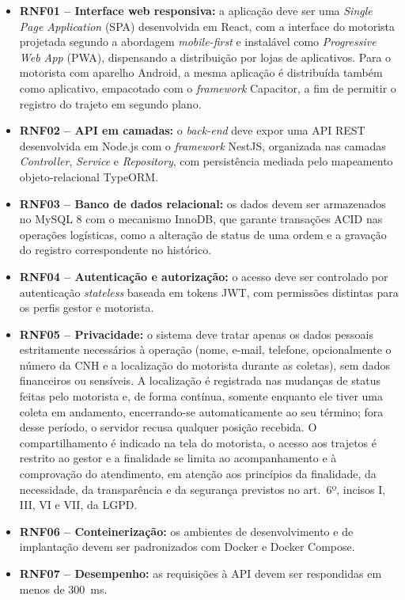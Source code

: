 \begin{itemize}
  \item \textbf{RNF01 -- Interface web responsiva:} a aplicação deve ser uma \textit{Single Page Application} (SPA) desenvolvida em React, com a interface do motorista projetada segundo a abordagem \textit{mobile-first} e instalável como \textit{Progressive Web App} (PWA), dispensando a distribuição por lojas de aplicativos. Para o motorista com aparelho Android, a mesma aplicação é distribuída também como aplicativo, empacotado com o \textit{framework} Capacitor, a fim de permitir o registro do trajeto em segundo plano.
  \item \textbf{RNF02 -- API em camadas:} o \textit{back-end} deve expor uma API REST desenvolvida em Node.js com o \textit{framework} NestJS, organizada nas camadas \textit{Controller}, \textit{Service} e \textit{Repository}, com persistência mediada pelo mapeamento objeto-relacional TypeORM.
  \item \textbf{RNF03 -- Banco de dados relacional:} os dados devem ser armazenados no MySQL 8 com o mecanismo InnoDB, que garante transações ACID nas operações logísticas, como a alteração de status de uma ordem e a gravação do registro correspondente no histórico.
  \item \textbf{RNF04 -- Autenticação e autorização:} o acesso deve ser controlado por autenticação \textit{stateless} baseada em tokens JWT, com permissões distintas para os perfis gestor e motorista.
  \item \textbf{RNF05 -- Privacidade:} o sistema deve tratar apenas os dados pessoais estritamente necessários à operação (nome, e-mail, telefone, opcionalmente o número da CNH e a localização do motorista durante as coletas), sem dados financeiros ou sensíveis. A localização é registrada nas mudanças de status feitas pelo motorista e, de forma contínua, somente enquanto ele tiver uma coleta em andamento, encerrando-se automaticamente ao seu término; fora desse período, o servidor recusa qualquer posição recebida. O compartilhamento é indicado na tela do motorista, o acesso aos trajetos é restrito ao gestor e a finalidade se limita ao acompanhamento e à comprovação do atendimento, em atenção aos princípios da finalidade, da necessidade, da transparência e da segurança previstos no art.~6º, incisos I, III, VI e VII, da LGPD.
  \item \textbf{RNF06 -- Conteinerização:} os ambientes de desenvolvimento e de implantação devem ser padronizados com Docker e Docker Compose.
  \item \textbf{RNF07 -- Desempenho:} as requisições à API devem ser respondidas em menos de 300~ms.
\end{itemize}

